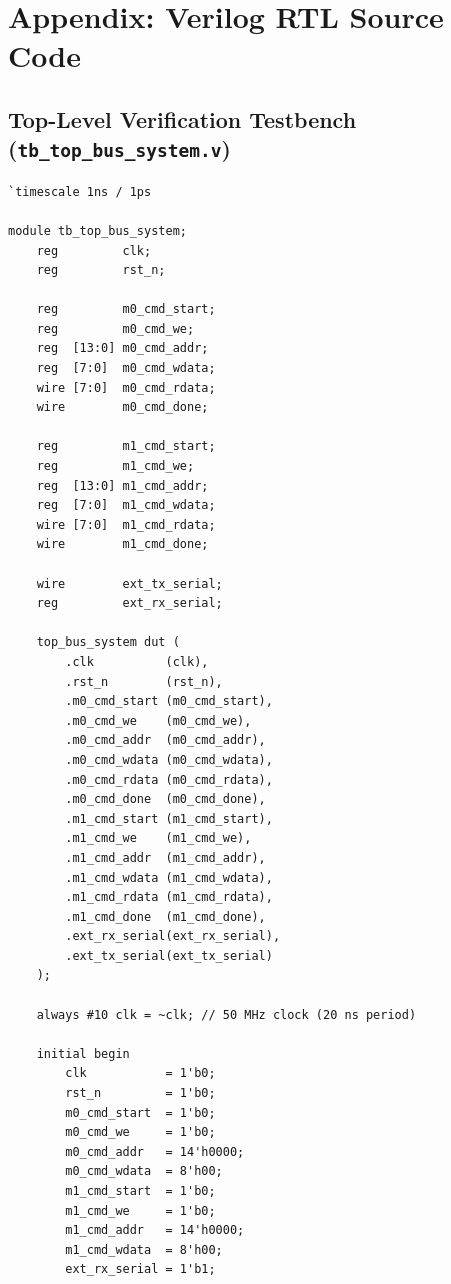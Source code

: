 \documentclass[11pt,a4paper]{article}
\begin{document}
\newpage
\section{Appendix: Verilog RTL Source Code}

\subsection{Top-Level Verification Testbench (\texttt{tb\_top\_bus\_system.v})}
\begin{lstlisting}[caption={Simulation Testbench: \texttt{tb\_top\_bus\_system.v}}]
`timescale 1ns / 1ps

module tb_top_bus_system;
    reg         clk;
    reg         rst_n;

    reg         m0_cmd_start;
    reg         m0_cmd_we;
    reg  [13:0] m0_cmd_addr;
    reg  [7:0]  m0_cmd_wdata;
    wire [7:0]  m0_cmd_rdata;
    wire        m0_cmd_done;

    reg         m1_cmd_start;
    reg         m1_cmd_we;
    reg  [13:0] m1_cmd_addr;
    reg  [7:0]  m1_cmd_wdata;
    wire [7:0]  m1_cmd_rdata;
    wire        m1_cmd_done;

    wire        ext_tx_serial;
    reg         ext_rx_serial;

    top_bus_system dut (
        .clk          (clk),
        .rst_n        (rst_n),
        .m0_cmd_start (m0_cmd_start),
        .m0_cmd_we    (m0_cmd_we),
        .m0_cmd_addr  (m0_cmd_addr),
        .m0_cmd_wdata (m0_cmd_wdata),
        .m0_cmd_rdata (m0_cmd_rdata),
        .m0_cmd_done  (m0_cmd_done),
        .m1_cmd_start (m1_cmd_start),
        .m1_cmd_we    (m1_cmd_we),
        .m1_cmd_addr  (m1_cmd_addr),
        .m1_cmd_wdata (m1_cmd_wdata),
        .m1_cmd_rdata (m1_cmd_rdata),
        .m1_cmd_done  (m1_cmd_done),
        .ext_rx_serial(ext_rx_serial),
        .ext_tx_serial(ext_tx_serial)
    );

    always #10 clk = ~clk; // 50 MHz clock (20 ns period)

    initial begin
        clk           = 1'b0;
        rst_n         = 1'b0;
        m0_cmd_start  = 1'b0;
        m0_cmd_we     = 1'b0;
        m0_cmd_addr   = 14'h0000;
        m0_cmd_wdata  = 8'h00;
        m1_cmd_start  = 1'b0;
        m1_cmd_we     = 1'b0;
        m1_cmd_addr   = 14'h0000;
        m1_cmd_wdata  = 8'h00;
        ext_rx_serial = 1'b1;


\end{lstlisting}
\end{document}
